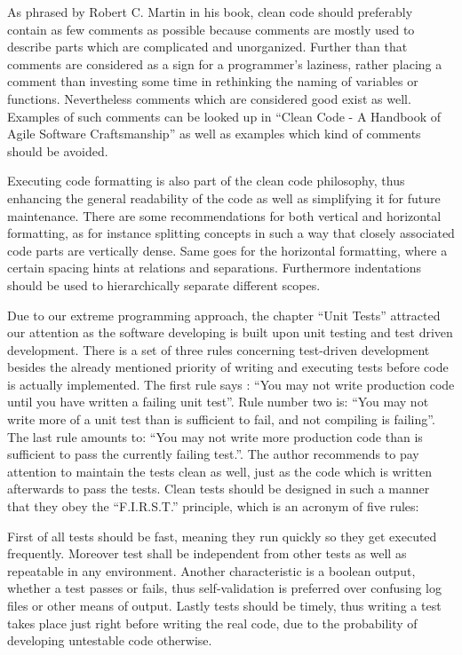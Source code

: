 {As phrased by Robert C. Martin in his book, clean code should
preferably contain as few comments as possible because comments are
mostly used to describe parts which are complicated and unorganized.
Further than that comments are considered as a sign for a programmer's
laziness, rather placing a comment than investing some time in
rethinking the naming of variables or functions. Nevertheless comments
which are considered good exist as well. Examples of such comments can
be looked up in ``Clean Code - A Handbook of Agile Software
Craftsmanship'' as well as examples which kind of comments should be
avoided.}

{Executing code formatting is also part of the clean code philosophy,
thus enhancing the general readability of the code as well as
simplifying it for future maintenance. There are some recommendations
for both vertical and horizontal formatting, as for instance splitting
concepts in such a way that closely associated code parts are vertically
dense. Same goes for the horizontal formatting, where a certain spacing
hints at relations and separations. Furthermore indentations should be
used to hierarchically separate different scopes.}

{Due to our extreme programming approach, the chapter ``Unit Tests''
attracted our attention as the software developing is built upon unit
testing and test driven development. There is a set of three rules
concerning test-driven development besides the already mentioned
priority of writing and executing tests before code is actually
implemented. The first rule says : ``You may not write production code
until you have written a failing unit test''. Rule number two is: ``You
may not write more of a unit test than is sufficient to fail, and not
compiling is failing''. The last rule amounts to: ``You may not write
more production code than is sufficient to pass the currently failing
test.''. The author recommends to pay attention to maintain the tests
clean as well, just as the code which is written afterwards to pass the
tests. Clean tests should be designed in such a manner that they obey
the ``F.I.R.S.T.'' principle, which is an acronym of five rules:}

{First of all tests should be }{f}{ast, meaning they run quickly so they
get executed frequently. Moreover test shall be }{i}{ndependent from
other tests as well as }{r}{epeatable in any environment. Another
characteristic is a boolean output, whether a test passes or fails, thus
}{s}{elf-validation is preferred over confusing log files or other means
of output. Lastly tests should be }{t}{imely, thus writing a test takes
place just right before writing the real code, due to the probability of
developing untestable code otherwise.}

